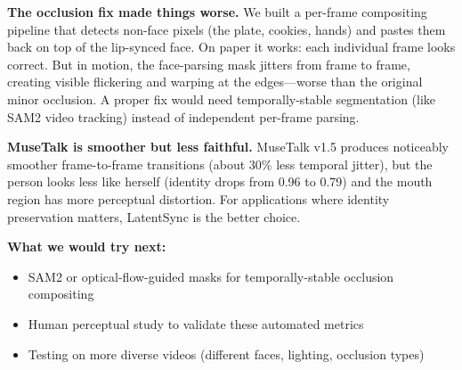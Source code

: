 \documentclass[11pt,a4paper]{article}
\begin{document}
\vspace{0.5em}
\noindent\textbf{The occlusion fix made things worse.}
We built a per-frame compositing pipeline that detects non-face pixels
(the plate, cookies, hands) and pastes them back on top of the lip-synced
face. On paper it works: each individual frame looks correct. But in motion,
the face-parsing mask jitters from frame to frame, creating visible
flickering and warping at the edges---worse than the original minor
occlusion. A proper fix would need temporally-stable segmentation
(like SAM2 video tracking) instead of independent per-frame parsing.

\vspace{0.5em}
\noindent\textbf{MuseTalk is smoother but less faithful.}
MuseTalk v1.5 produces noticeably smoother frame-to-frame transitions
(about 30\% less temporal jitter), but the person looks less like herself
(identity drops from 0.96 to 0.79) and the mouth region has more
perceptual distortion. For applications where identity preservation
matters, LatentSync is the better choice.

\vspace{0.5em}
\noindent\textbf{What we would try next:}
\begin{itemize}
  \item SAM2 or optical-flow-guided masks for temporally-stable occlusion compositing
  \item Human perceptual study to validate these automated metrics
  \item Testing on more diverse videos (different faces, lighting, occlusion types)
\end{itemize}
\end{document}
